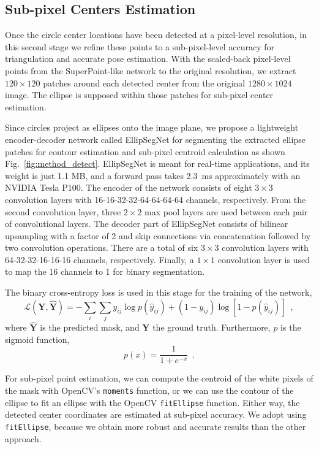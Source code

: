 \documentclass[final]{cvpr}
\begin{document}
\subsection{Sub-pixel Centers Estimation}
Once the circle center locations have been detected at a pixel-level resolution, in this second stage we refine these points to a sub-pixel-level accuracy for triangulation and accurate pose estimation. With the scaled-back pixel-level points from the SuperPoint-like network to the original resolution, we extract $120 \times 120$ patches around each detected center from the original $1280 \times 1024$ image. The ellipse is supposed within those patches for sub-pixel center estimation.

Since circles project as ellipses onto the image plane, we propose a lightweight encoder-decoder network called EllipSegNet for segmenting the extracted ellipse patches for contour estimation and sub-pixel centroid calculation as shown Fig.~\ref{fig:method_detect}. EllipSegNet is meant for real-time applications, and its weight is just 1.1 MB, and a forward pass takes 2.3~ms approximately with an NVIDIA Tesla P100. The encoder of the network consists of eight $3\times 3$ convolution layers with 16-16-32-32-64-64-64-64 channels, respectively. From the second convolution layer, three $2 \times 2$ max pool layers are used between each pair of convolutional layers. The decoder part of EllipSegNet consists of bilinear upsampling with a factor of 2 and skip connections via concatenation followed by two convolution operations. There are a total of six $3 \times 3$ convolution layers with 64-32-32-16-16-16 channels, respectively. Finally, a $1 \times 1$ convolution layer is used to map the 16 channels to 1 for binary segmentation.


The binary cross-entropy loss is used in this stage for the training of the network,
%
\begin{equation}
    \mathcal{L}(\mathbf{Y},\hat{\mathbf{Y}}) = - \sum_i \sum_j y_{ij} \log p(\hat{y}_{ij}) + (1-y_{ij}) \log [1- p(\hat{y}_{ij})]  \enspace,
\end{equation}
%
where $\hat{\mathbf{Y}}$ is the predicted mask, and $\mathbf{Y}$ the ground truth. Furthermore, $p$ is the sigmoid function,
%
\begin{equation}
    p(x) = \dfrac{1}{1+e^{-x}}  \enspace.
\end{equation}
%

For sub-pixel point estimation, we can compute the centroid of the white pixels of the mask with OpenCV's \texttt{moments} function, or we can use the contour of the ellipse to fit an ellipse with the OpenCV \texttt{fitEllipse} function. Either way, the detected center coordinates are estimated at sub-pixel accuracy. We adopt using \texttt{fitEllipse}, because we obtain more robust and accurate results than the other approach.
\end{document}
